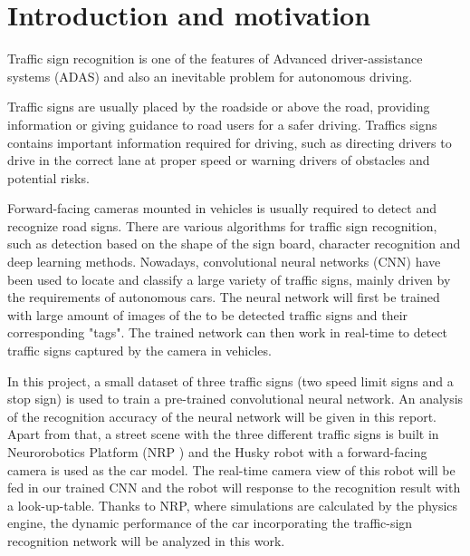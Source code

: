
\section{Introduction and motivation}
Traffic sign recognition is one of the features of Advanced driver-assistance systems (ADAS) and also an inevitable problem for autonomous driving. 

Traffic signs are usually placed by the roadside or above the road, providing information or giving guidance to road users for a safer driving. Traffics signs contains important information required for driving, such as directing drivers to drive in the correct lane at proper speed or warning drivers of obstacles and potential risks. 

Forward-facing cameras mounted in vehicles is usually required to detect and recognize road signs. There are various algorithms for traffic sign recognition, such as detection based on the shape of the sign board, character recognition and deep learning methods.  Nowadays, convolutional neural networks (CNN) have been used to locate and classify a large variety of traffic signs, mainly driven by the requirements of autonomous cars. The neural network will first be trained with large amount of images of the to be detected traffic signs and their corresponding "tags". The trained network can then work in real-time to detect traffic signs captured by the camera in vehicles.

In this project, a small dataset of three traffic signs (two speed limit signs and a stop sign) is used to train a pre-trained convolutional neural network. An analysis of the recognition accuracy of the neural network will be given in this report. Apart from that, a street scene with the three different traffic signs is built in Neurorobotics Platform (NRP \cite{nrp}) and the Husky robot with a forward-facing camera is used as the car model. The real-time camera view of this robot will be fed in our trained CNN and the robot will response to the recognition result with a look-up-table. Thanks to NRP, where simulations are calculated by the physics engine, the dynamic performance of the car incorporating the traffic-sign recognition network will be analyzed in this work.
